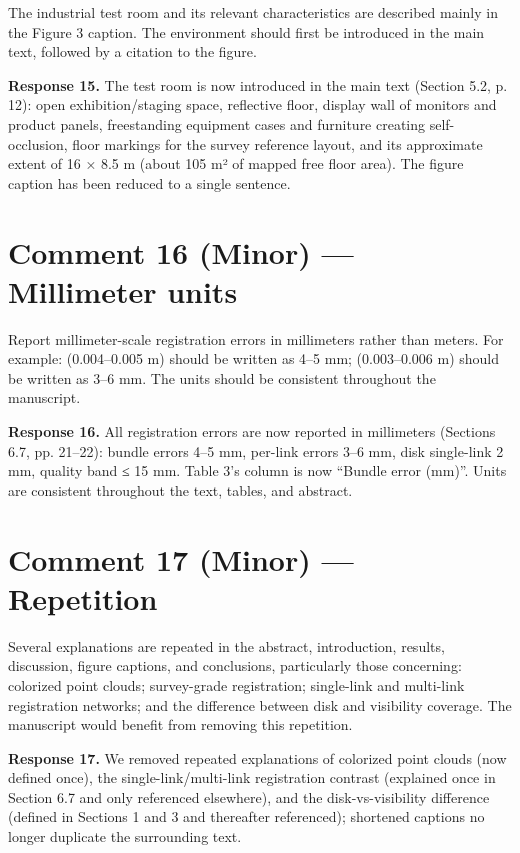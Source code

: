 \begin{quoting}
The industrial test room and its relevant characteristics are described mainly in the Figure 3 caption. The environment should first be introduced in the main text, followed by a citation to the figure.
\end{quoting}

\textbf{Response 15.} The test room is now introduced in the main text (Section 5.2, p. 12): open exhibition/staging space, reflective floor, display wall of monitors and product panels, freestanding equipment cases and furniture creating self-occlusion, floor markings for the survey reference layout, and its approximate extent of 16 × 8.5 m (about 105 m² of mapped free floor area). The figure caption has been reduced to a single sentence.

\section*{Comment 16 (Minor) — Millimeter units}

\begin{quoting}
Report millimeter-scale registration errors in millimeters rather than meters. For example: (0.004–0.005 m) should be written as 4–5 mm; (0.003–0.006 m) should be written as 3–6 mm. The units should be consistent throughout the manuscript.
\end{quoting}

\textbf{Response 16.} All registration errors are now reported in millimeters (Sections 6.7, pp. 21–22): bundle errors 4–5 mm, per-link errors 3–6 mm, disk single-link 2 mm, quality band ≤ 15 mm. Table 3’s column is now “Bundle error (mm)”. Units are consistent throughout the text, tables, and abstract.

\section*{Comment 17 (Minor) — Repetition}

\begin{quoting}
Several explanations are repeated in the abstract, introduction, results, discussion, figure captions, and conclusions, particularly those concerning: colorized point clouds; survey-grade registration; single-link and multi-link registration networks; and the difference between disk and visibility coverage. The manuscript would benefit from removing this repetition.
\end{quoting}

\textbf{Response 17.} We removed repeated explanations of colorized point clouds (now defined once), the single-link/multi-link registration contrast (explained once in Section 6.7 and only referenced elsewhere), and the disk-vs-visibility difference (defined in Sections 1 and 3 and thereafter referenced); shortened captions no longer duplicate the surrounding text.


